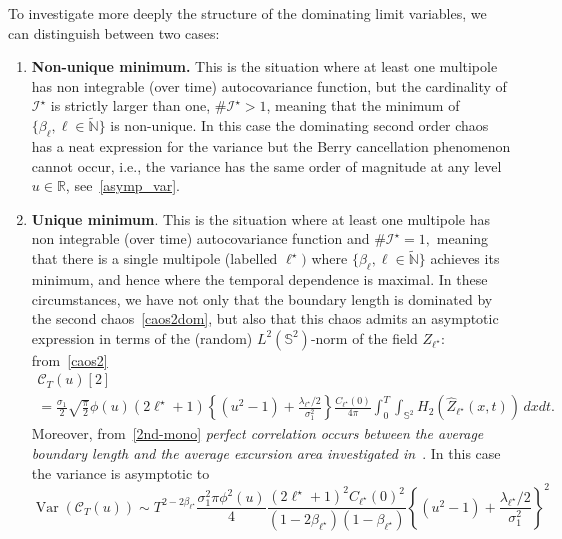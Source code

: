 \documentclass[10pt]{amsart}
\theoremstyle{definition}\newtheorem{defi}[theo]{Definition}\newtheorem{rema}[theo]{Remark}\newtheorem{exam}[theo]{Example}\newtheorem{exem}[theo]{Example}\newtheorem{nota}[theo]{Notation}
\newcommand{\clI}{\mathcal{I}}
\newcommand{\clC}{\mathcal{C}}
\newcommand{\bbS}{\mathbb{S}}
\newcommand{\bbR}{\mathbb{R}}
\newcommand{\bbN}{\mathbb{N}}
\DeclareMathOperator{\Var}{Var}
\begin{document}
To investigate more deeply the structure of the dominating limit variables, we can distinguish between two cases:
\begin{enumerate}
\item \textbf{Non-unique minimum.} This is the situation where at least one multipole has non integrable (over time) autocovariance function, but the cardinality of $\clI^{\star }$ is strictly larger than one, $\#\clI^{\star }>1$, meaning that the minimum of $\{\beta _{\ell }, \ell\in \widetilde{\bbN} \}$ is non-unique. In this case the dominating second order chaos has a neat expression for the variance but the Berry cancellation phenomenon cannot occur, i.e., the variance has the same order of magnitude at any level $u\in\bbR$, see~\eqref{asymp_var}.
\item \textbf{Unique minimum}. This is the situation where at least one multipole has non integrable (over time) autocovariance function and $\#
\clI^{\star }=1,$ meaning that there is a single multipole (labelled $
\ell ^{\star })$ where $\{\beta _{\ell }, \ell\in \widetilde{\bbN }\}$ achieves its minimum, and hence where the temporal dependence is maximal. In these circumstances, we have not only that the boundary length is dominated by the second chaos~\eqref{caos2dom}, but also that this chaos admits an asymptotic expression in terms of the (random) $L^{2}(\bbS ^2) $-norm of the field $Z_{\ell^{\star}}$: from~\eqref{caos2}
\begin{multline}\label{2nd-mono}
\clC_T(u)[2]\\
=\frac{\sigma _{1}}{2}\sqrt{\frac{\pi }{2}}\phi (u)\left(2\ell^{\star }+1\right)\left\{\left(u^{2}-1\right)+\frac{\lambda _{\ell^{\star }}/2}{\sigma _{1}^{2}}\right\} \frac{C_{\ell^\star}(0)}{4\pi} \int_0^T\int_{\bbS ^{2}}H_{2}\left(\widehat Z_{\ell^\star}(x,t)\right)\,dxdt.
\end{multline}
Moreover, from~\eqref{2nd-mono} \emph{perfect correlation occurs between the average boundary length and the average excursion area investigated in~\cite {MRV:20}}. In this case the variance is asymptotic to
\begin{equation}\label{Berry}
\Var\left(\clC_{T}(u)\right)\sim{T^{2-2\beta_{\ell^\star}}}\frac{\sigma_{1}^{2}\pi \phi^{2}(u)}{4} \frac{\left(2\ell^\star+1\right)^{2} C_{\ell^\star}(0)^2}{\left(1-2\beta_{\ell^\star}\right)\left(1-\beta_{\ell^\star}\right)} \left\{\left(u^{2}-1\right)+\frac{\lambda_{\ell^\star}/2}{\sigma_{1}^{2}}\right\}^2 
\end{equation}
\end{enumerate}
\end{document}
